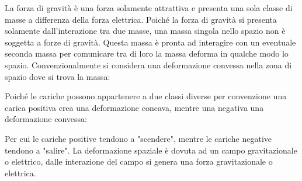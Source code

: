 \documentclass{article}
\numberwithin{equation}{subsection}
\begin{document}
La forza di gravità è una forza solamente attrattiva e presenta una sola classe di masse a differenza della forza elettrica. Poiché la forza di gravità si 
presenta solamente dall'interazione tra due masse, una massa singola nello spazio non è soggetta a forze di gravità. Questa massa è pronta ad interagire con un eventuale 
seconda massa per comunicare tra di loro la massa deforma in qualche modo lo spazio. Convenzionalmente si considera una deformazione convessa nella zona di spazio dove 
si trova la massa: 
\begin{center}
\end{center}

Poiché le cariche possono appartenere a due classi diverse per convenzione una carica positiva crea una deformazione concava, mentre una negativa una deformazione convessa: 
\begin{center}
\end{center}
Per cui le cariche positive tendono a "scendere", mentre le cariche negative tendono a "salire". La deformazione spaziale è dovuta ad un campo gravitazionale o elettrico, 
dalle interazione del campo si genera una forza gravitazionale o elettrica. 
\end{document}
